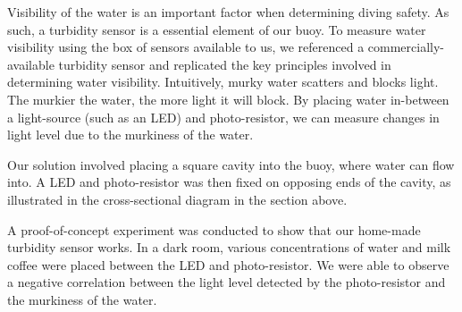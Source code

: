 \documentclass{article}
\begin{document}
\begin{multicols}{2}
Visibility of the water is an important factor when determining diving safety. As such, a turbidity sensor is a essential element of our buoy. To measure water visibility using the box of sensors available to us, we referenced a commercially-available turbidity sensor and replicated the key principles involved in determining water visibility. Intuitively, murky water scatters and blocks light. The murkier the water, the more light it will block. By placing water in-between a light-source (such as an LED) and photo-resistor, we can measure changes in light level due to the murkiness of the water.

Our solution involved placing a square cavity into the buoy, where water can flow into. A LED and photo-resistor was then fixed on opposing ends of the cavity, as illustrated in the cross-sectional diagram in the section above.

A proof-of-concept experiment was conducted to show that our home-made turbidity sensor works. In a dark room, various concentrations of water and milk coffee were placed between the LED and photo-resistor. We were able to observe a negative correlation between the light level detected by the photo-resistor and the murkiness of the water.

\end{multicols}
\end{document}
